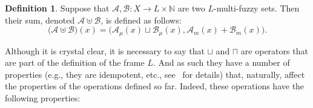 \documentclass{amsart}
\theoremstyle{definition}
\newtheorem{definition}[theorem]{Definition}
\begin{document}
\begin{definition}
Suppose that $\mathscr{A},\mathscr{B}:X\rightarrow L\times\mathbb{N}$ 
are two $L$-multi-fuzzy sets. Then their sum, denoted 
$\mathscr{A}\uplus\mathscr{B}$, is defined as follows:
\begin{displaymath}
\bigl(\mathscr{A}\uplus\mathscr{B}\bigr)(x)=\biggl(\mathscr{A}_{\mu}(x)
                                                 \sqcup\mathscr{B}_{\mu}(x),
                                                 \mathscr{A}_{m}(x) + \mathscr{B}_{m}(x)
                                           \biggr).
\end{displaymath}
\end{definition}
Although it is crystal clear, it is necessary to say that $\sqcup$ and $\sqcap$ are 
operators that are part of the definition of the frame $L$. And as such they have a number
of properties (e.g., they are idempotent, etc., see~\cite[p.~15]{vickers90} for details) 
that, naturally, affect the properties of the operations defined so far. Indeed, these 
operations have the following properties:
\end{document}
